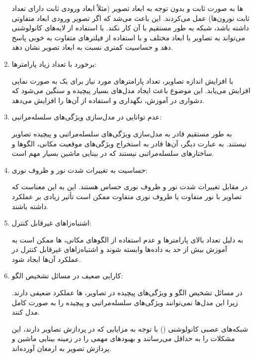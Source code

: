 \documentclass{article}
\begin{document}
\begin{enumerate}
    ‌ها به صورت ثابت و بدون توجه به ابعاد تصویر (مثلاً ابعاد ورودی ثابت دارای تعداد ثابت نورون‌ها) عمل می‌کردند. این باعث می‌شد که اگر تصویر ورودی ابعاد متفاوتی داشته باشد، شبکه به طور مستقیم با آن کار نکند.
     با استفاده از لایه‌های کانولوشنی می‌تواند به تصاویر با ابعاد مختلف و با استفاده از فیلترهای متفاوت به خوبی پاسخ دهد و حساسیت کمتری نسبت به ابعاد تصویر نشان دهد.

\item برخورد با تعداد زیاد پارامترها:

    با افزایش اندازه تصاویر، تعداد پارامترهای مورد نیاز برای یک  به صورت نمایی افزایش می‌یابد. این موضوع باعث ایجاد مدل‌های بسیار پیچیده و سنگین می‌شود که دشواری در آموزش، نگهداری و استفاده از آن‌ها را افزایش می‌دهد.

\item عدم توانایی در مدل‌سازی ویژگی‌های سلسله‌مراتبی:

     به طور مستقیم قادر به مدل‌سازی ویژگی‌های سلسله‌مراتبی و پیچیده تصاویر نیستند. به عبارت دیگر، آن‌ها قادر به استخراج ویژگی‌های موقعیت مکانی، الگوها و ساختارهای سلسله‌مراتبی نیستند که در بینایی ماشین بسیار مهم است.

\item حساسیت به تغییرات شدت نور و ظروف نوری:

     در مقابل تغییرات شدت نور و ظروف نوری حساس هستند. این به این معناست که تصاویر با نور متفاوت یا ظروف نوری متفاوت ممکن است تأثیر زیادی بر عملکرد  داشته باشند.

\item اشتباه‌زاهای غیرقابل کنترل:

    به دلیل تعداد بالای پارامترها و عدم استفاده از الگوهای مکانی، ‌ها ممکن است به آموزش بیش از حد به داده‌ها وابسته شوند و اشتباه‌زاهای غیرقابل کنترل در عملکرد آن‌ها ایجاد شود.

\item کارایی ضعیف در مسائل تشخیص الگو:

    در مسائل تشخیص الگو و ویژگی‌های پیچیده در تصاویر، ‌ها عملکرد ضعیفی دارند. زیرا این مدل‌ها نمی‌توانند ویژگی‌های سلسله‌مراتبی و پیچیده را به صورت کامل مدل کنند.

شبکه‌های عصبی کانولوشنی () با توجه به مزایایی که در پردازش تصاویر دارند، این مشکلات را به حداقل می‌رسانند و بهبودهای مهمی را در زمینه بینایی ماشین و پردازش تصویر به ارمغان آورده‌اند.
\end{enumerate}

\section{}
\end{document}
